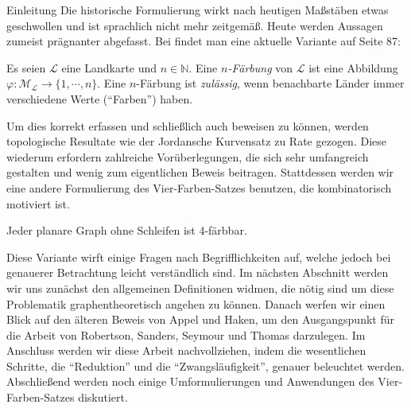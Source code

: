 \begin{chapter}{Einleitung}
 Die historische Formulierung wirkt nach heutigen Maßstäben etwas geschwollen und ist sprachlich nicht mehr zeitgemäß. Heute werden Aussagen zumeist prägnanter abgefasst. Bei \cite{fritsch} findet man eine aktuelle Variante auf Seite 87:  
 
 \begin{satz}
  Es seien $\mathcal{L}$ eine Landkarte und $n \in \mathbb{N}$. Eine \textit{$n$-Färbung} von $\mathcal{L}$ ist eine Abbildung $\varphi: \mathcal{M}_{\mathcal{L}} \rightarrow \{1,\cdots,n\}$. Eine $n$-Färbung ist \textit{zulässig}, wenn benachbarte Länder immer verschiedene Werte (``Farben'') haben.
 \end{satz}

 Um dies korrekt erfassen und schließlich auch beweisen zu können, werden topologische Resultate wie der Jordansche Kurvensatz zu Rate gezogen. Diese wiederum erfordern zahlreiche Vorüberlegungen, die sich sehr umfangreich gestalten und wenig zum eigentlichen Beweis beitragen. Stattdessen werden wir eine andere Formulierung des Vier-Farben-Satzes benutzen, die kombinatorisch motiviert ist. 
 
 \begin{satz}
  Jeder planare Graph ohne Schleifen ist 4-färbbar.
 \end{satz}
 
 Diese Variante wirft einige Fragen nach Begrifflichkeiten auf, welche jedoch bei genauerer Betrachtung leicht verständlich sind. Im nächsten Abschnitt werden wir uns zunächst den allgemeinen Definitionen widmen, die nötig sind um diese Problematik graphentheoretisch angehen zu können. Danach werfen wir einen Blick auf den älteren Beweis von Appel und Haken, um den Ausgangspunkt für die Arbeit von Robertson, Sanders, Seymour und Thomas darzulegen. Im Anschluss werden wir diese Arbeit nachvollziehen, indem die wesentlichen Schritte, die ``Reduktion'' und die ``Zwangsläufigkeit'', genauer beleuchtet werden. Abschließend werden noch einige Umformulierungen und Anwendungen des Vier-Farben-Satzes diskutiert.
\end{chapter}